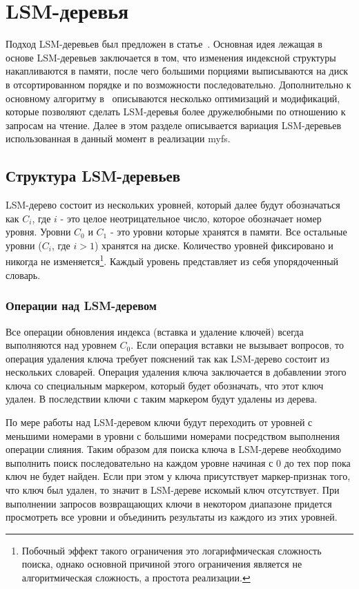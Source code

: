 \section{LSM-деревья}

Подход LSM-деревьев был предложен в статье~\cite{LSM}. Основная идея лежащая в
основе LSM-деревьев заключается в том, что изменения индексной структуры
накапливаются в памяти, после чего большими порциями выписываются на диск в
отсортированном порядке и по возможности последовательно. Дополнительно к
основному алгоритму в~\cite{BLSM} описываются несколько оптимизаций и
модификаций, которые позволяют сделать LSM-деревья более дружелюбными по
отношению к запросам на чтение. Далее в этом разделе описывается вариация
LSM-деревьев использованная в данный момент в реализации myfs.


\subsection{Структура LSM-деревьев}

LSM-дерево состоит из нескольких уровней, который далее будут обозначаться как
$C_i$, где $i$ - это целое неотрицательное число, которое обозначает номер
уровня. Уровни $C_0$ и $C_1$ - это уровни которые хранятся в памяти. Все
остальные уровни ($C_i$, где $i > 1$) хранятся на диске. Количество уровней
фиксировано и никогда не изменяется\footnote{Побочный эффект такого ограничения
это логарифмическая сложность поиска, однако основной причиной этого ограничения
является не алгоритмическая сложность, а простота реализации.}. Каждый уровень
представляет из себя упорядоченный словарь.


\subsubsection{Операции над LSM-деревом}

Все операции обновления индекса (вставка и удаление ключей) всегда выполняются
над уровнем $C_0$. Если операция вставки не вызывает вопросов, то операция
удаления ключа требует пояснений так как LSM-дерево состоит из нескольких
словарей. Операция удаления ключа заключается в добавлении этого ключа со
специальным маркером, который будет обозначать, что этот ключ удален. В
последствии ключи с таким маркером будут удалены из дерева.

По мере работы над LSM-деревом ключи будут переходить от уровней с меньшими
номерами в уровни с большими номерами посредством выполнения операции слияния.
Таким образом для поиска ключа в LSM-дереве необходимо выполнить поиск
последовательно на каждом уровне начиная с 0 до тех пор пока ключ не будет
найден. Если при этом у ключа присутствует маркер-признак того, что ключ был
удален, то значит в LSM-дереве искомый ключ отсутствует. При выполнении запросов
возвращающих ключи в некотором диапазоне придется просмотреть все уровни и
объединить результаты из каждого из этих уровней.


